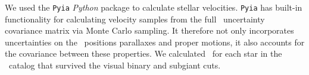 We used the {\tt Pyia} {\it Python} package to calculate stellar velocities.
{\tt Pyia} has built-in functionality for calculating velocity samples from
the full \gaia\ uncertainty covariance matrix via Monte Carlo sampling.
It therefore not only incorporates uncertainties on the \gaia\ positions
parallaxes and proper motions, it also accounts for the covariance between
these properties.
We calculated \vb\ for each star in the \mct\ catalog that survived the visual
binary and subgiant cuts.

